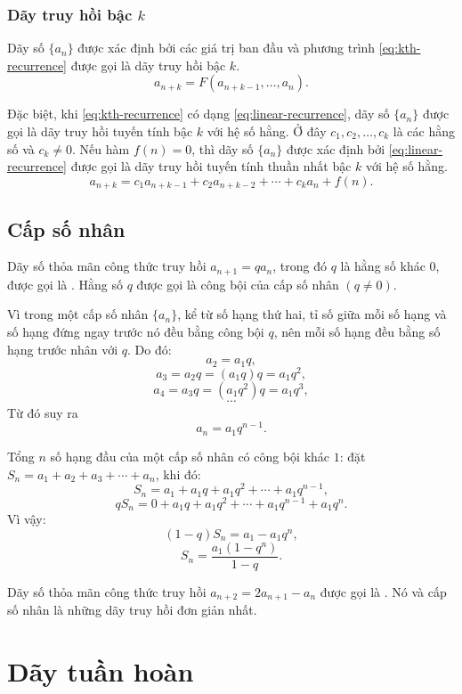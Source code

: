 \documentclass[11pt]{article}
\begin{document}
\subsubsection{Dãy truy hồi bậc \texorpdfstring{$k$}{k}}

Dãy số $\{a_n\}$ được xác định bởi các giá trị ban đầu và phương trình
\eqref{eq:kth-recurrence} được gọi là dãy truy hồi bậc $k$.
\begin{equation}
  a_{n+k}=F(a_{n+k-1},\ldots,a_n).
  \label{eq:kth-recurrence}
\end{equation}

Đặc biệt, khi \eqref{eq:kth-recurrence} có dạng
\eqref{eq:linear-recurrence}, dãy số $\{a_n\}$ được gọi là dãy truy hồi tuyến
tính bậc $k$ với hệ số hằng. Ở đây $c_1,c_2,\ldots,c_k$ là các hằng số và
$c_k\ne 0$. Nếu hàm $f(n)=0$, thì dãy số $\{a_n\}$ được xác định bởi
\eqref{eq:linear-recurrence} được gọi là dãy truy hồi tuyến tính thuần nhất
bậc $k$ với hệ số hằng.
\begin{equation}
  a_{n+k}=c_1a_{n+k-1}+c_2a_{n+k-2}+\cdots+c_ka_n+f(n).
  \label{eq:linear-recurrence}
\end{equation}

\subsection{Cấp số nhân}

Dãy số thỏa mãn công thức truy hồi $a_{n+1}=qa_n$, trong đó $q$ là hằng số
khác $0$, được gọi là . Hằng số $q$ được gọi là công bội của
cấp số nhân $(q\ne 0)$.

Vì trong một cấp số nhân $\{a_n\}$, kể từ số hạng thứ hai, tỉ số giữa mỗi số
hạng và số hạng đứng ngay trước nó đều bằng công bội $q$, nên mỗi số hạng đều
bằng số hạng trước nhân với $q$. Do đó:
\[
  a_2=a_1q,
\]
\[
  a_3=a_2q=(a_1q)q=a_1q^2,
\]
\[
  a_4=a_3q=(a_1q^2)q=a_1q^3,
\]
\[
  \cdots
\]
Từ đó suy ra
\[
  a_n=a_1q^{n-1}.
\]

Tổng $n$ số hạng đầu của một cấp số nhân có công bội khác $1$: đặt
$S_n=a_1+a_2+a_3+\cdots+a_n$, khi đó:
\[
  S_n=a_1+a_1q+a_1q^2+\cdots+a_1q^{n-1},
\]
\[
  qS_n=0+a_1q+a_1q^2+\cdots+a_1q^{n-1}+a_1q^n.
\]
Vì vậy:
\[
  (1-q)S_n=a_1-a_1q^n,
\]
\[
  S_n=\frac{a_1(1-q^n)}{1-q}.
\]

Dãy số thỏa mãn công thức truy hồi $a_{n+2}=2a_{n+1}-a_n$ được gọi là
. Nó và cấp số nhân là những dãy truy hồi đơn giản nhất.

\section{Dãy tuần hoàn}
\end{document}
